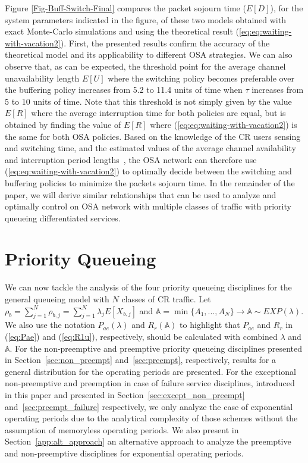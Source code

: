 \documentclass[11pt,journal,oneside,onecolumn,draftclsnofoot]{IEEEtran}
\begin{document}
Figure \ref{Fig-Buff-Switch-Final} compares the packet sojourn time ($E[D]$), for the system parameters indicated in the figure, of these two models obtained with exact Monte-Carlo simulations and using the theoretical result (\ref{eq:eq:waiting-with-vacation2}). First, the presented results confirm the accuracy of the theoretical model and its applicability to different OSA strategies. We can also observe that, as can be expected, the threshold point for the average channel unavailability length $E[U]$ where the switching policy becomes preferable over the buffering policy increases from 5.2 to 11.4 units of time when $\tau$ increases from 5 to 10 units of time. Note that this threshold is not simply given by the value $E[R]$ where the average interruption time for both policies are equal, but is obtained by finding the value of $E[R]$ where (\ref{eq:eq:waiting-with-vacation2}) is the same for both OSA policies. Based on the knowledge of the CR users sensing and switching time, and the estimated values of the average channel availability and interruption period lengths~\cite{gab13}, the OSA network can therefore use (\ref{eq:eq:waiting-with-vacation2}) to optimally decide between the switching and buffering policies to minimize the packets sojourn time.
In the remainder of the paper, we will derive similar relationships that can be used to analyze and optimally control on OSA network with multiple classes of traffic with priority queueing differentiated services. 

\section{Priority Queueing}
\label{sec:pr-queueing}

We can now tackle the analysis of the four priority queueing disciplines for the general queueing model with $N$ classes of CR traffic. Let $\rho_b=\sum_{j=1}^{N}{\rho_{b,j}}=\sum_{j=1}^{N}{\lambda_j E[X_{b,j}]}$ and $\mathbb{A} = \min \{ A_1,...,A_{N} \} \rightarrow \mathbb{A} \sim EXP(\lambda)$.
We also use the notation $P_{ae}(\lambda)$ and $R_r(\mathbb{A})$ to highlight that $P_{ae}$ and $R_r$ in (\ref{eq:Pae}) and (\ref{eq:R1u}), respectively, should be calculated with combined $\lambda$ and $\mathbb{A}$. 
For the non-preemptive and preemptive priority queueing disciplines presented in Section~\ref{sec:non_preempt} and~\ref{sec:preempt}, respectively, results for a general distribution for the operating periods are presented. For the exceptional non-preemptive and preemption in case of failure service disciplines, introduced in this paper and presented in Section~\ref{sec:except_non_preempt} and~\ref{sec:preempt_failure} respectively, we only analyze the case of exponential operating periods due to the analytical complexity of those schemes without the assumption of memoryless operating periods. We also present in Section~\ref{app:alt_approach} an alternative approach to analyze the preemptive and non-preemptive disciplines for exponential operating periods.
\end{document}
